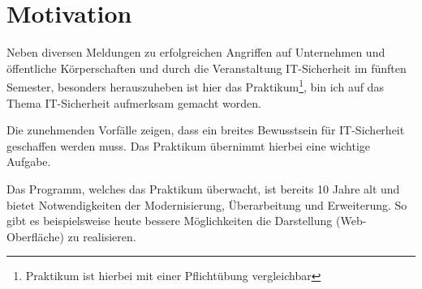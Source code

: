 \section{Motivation}
\label{sec:Motivation}
Neben diversen Meldungen zu erfolgreichen Angriffen auf Unternehmen und öffentliche Körperschaften und durch die Veranstaltung IT-Sicherheit im fünften Semester, besonders herauszuheben ist hier das Praktikum\footnote{Praktikum ist hierbei mit einer Pflichtübung vergleichbar}, bin ich auf das Thema IT-Sicherheit aufmerksam gemacht worden. 

Die zunehmenden Vorfälle zeigen, dass ein breites Bewusstsein für IT-Sicherheit geschaffen werden muss. Das Praktikum übernimmt hierbei eine wichtige Aufgabe.

Das Programm, welches das Praktikum überwacht, ist bereits 10 Jahre alt und bietet Notwendigkeiten der Modernisierung, Überarbeitung und Erweiterung. 
So gibt es beispielsweise heute bessere Möglichkeiten die Darstellung (Web-Oberfläche) zu realisieren.
